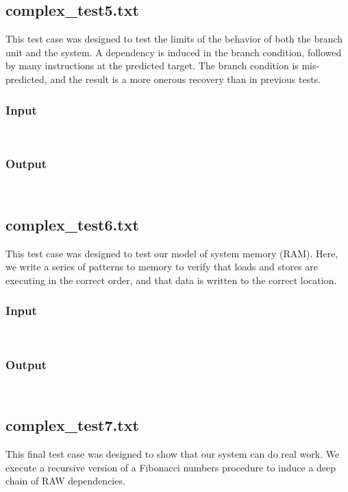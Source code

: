 \documentclass[12pt]{article}
\begin{document}
\subsection{complex\_test5.txt}
This test case was designed to test the limits of the behavior of both the branch unit and the system.  A dependency is induced in the branch condition, followed by many instructions at the predicted target.  The branch condition is mis-predicted, and the result is a more onerous recovery than in previous tests.  

\subsubsection*{Input}
\begin{verbatim}
    
\end{verbatim}

\subsubsection*{Output}
\begin{verbatim}
    
\end{verbatim}

\subsection{complex\_test6.txt}
This test case was designed to test our model of system memory (RAM).  Here, we write a series of patterns to memory to verify that loads and stores are executing in the correct order, and that data is written to the correct location.

\subsubsection*{Input}
\begin{verbatim}
    
\end{verbatim}

\subsubsection*{Output}
\begin{verbatim}
    
\end{verbatim}

\subsection{complex\_test7.txt}
This final test case was designed to show that our system can do real work.  We execute a recursive version of a Fibonacci numbers procedure to induce a deep chain of RAW dependencies.
\end{document}
